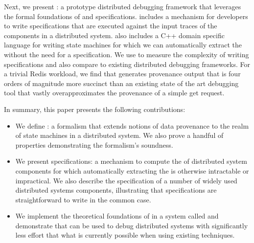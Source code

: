 Next, we present \fluent{}: a prototype distributed debugging framework that
leverages the formal foundations of \watprovenance{} and \watprovenance{}
specifications. \fluent{} includes a mechanism for developers to write
\watprovenance{} specifications that are executed against the input traces of
the components in a distributed system. \fluent{} also includes a C++ domain
specific language for writing state machines for which we can automatically
extract the \watprovenance{} without the need for a \watprovenance{}
specification. We use \fluent{} to measure the complexity of writing
\watprovenance{} specifications and also compare \fluent{} to existing
distributed debugging frameworks. For a trivial Redis workload, we find that
\fluent{} generates provenance output that is four orders of magnitude more
succinct than an existing state of the art debugging tool that vastly
overapproximates the provenance of a simple get request.

In summary, this paper presents the following contributions:
\begin{itemize}
  \item
    We define \watprovenance{}: a formalism that extends notions of data
    provenance to the realm of state machines in a distributed system. We also
    prove a handful of properties demonstrating the formalism's soundness.
  \item
    We present \watprovenance{} specifications: a mechanism to compute the
    \watprovenance{} of distributed system components for which automatically
    extracting the \watprovenance{} is otherwise intractable or impractical. We
    also describe the \watprovenance{} specification of a number of widely used
    distributed systems components, illustrating that \watprovenance{}
    specifications are straightforward to write in the common case.
  \item
    We implement the theoretical foundations of \watprovenance{} in a system
    called \fluent{} and demonstrate that \fluent{} can be used to debug
    distributed systems with significantly less effort that what is currently
    possible when using existing techniques.
\end{itemize}
